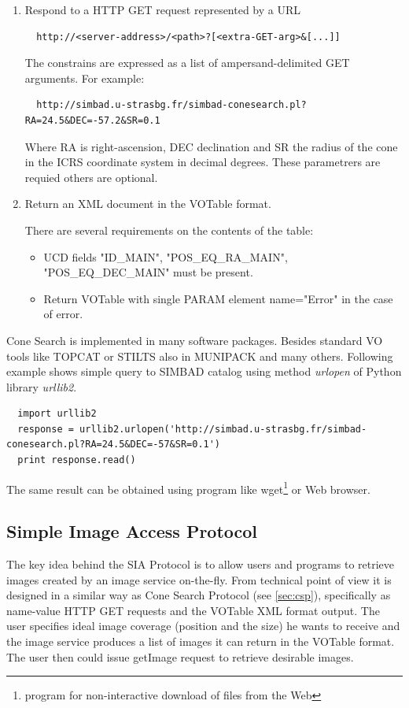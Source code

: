 \begin{enumerate}
\item Respond to a HTTP GET request represented by a URL 

\begin{lstlisting}
  http://<server-address>/<path>?[<extra-GET-arg>&[...]]
\end{lstlisting}

The constrains are expressed as a list of ampersand-delimited GET
arguments. For example:

\begin{lstlisting}
  http://simbad.u-strasbg.fr/simbad-conesearch.pl?RA=24.5&DEC=-57.2&SR=0.1
\end{lstlisting}

Where RA is right-ascension, DEC declination and SR the radius of the
cone in the ICRS coordinate system in decimal degrees. These
parametrers are requied others are optional.

\item Return an XML document in the VOTable format.  

  There are several requirements on the contents of the table:

  \begin{itemize}
  \item UCD fields "ID\_MAIN", "POS\_EQ\_RA\_MAIN", "POS\_EQ\_DEC\_MAIN" must
    be present.
  \item Return VOTable with single PARAM element name="Error" in the
    case of error.
  \end{itemize}

\end{enumerate}

Cone Search is implemented in many software packages. Besides standard
VO tools like TOPCAT or STILTS also in MUNIPACK and many others.
Following example shows simple query to SIMBAD \citep{wenger2000simbad}
catalog using method \emph{urlopen} of Python library \emph{urllib2}.
 
\begin{lstlisting}
  import urllib2
  response = urllib2.urlopen('http://simbad.u-strasbg.fr/simbad-conesearch.pl?RA=24.5&DEC=-57&SR=0.1')
  print response.read()
\end{lstlisting}

\noindent The same result can be obtained using program like wget\footnote{program
  for non-interactive download of files from the Web} or Web browser.

\subsection{Simple Image Access Protocol}
The key idea behind the SIA Protocol is to allow users and programs to
retrieve images created by an image service on-the-fly. From technical
point of view it is designed in a similar way as Cone Search Protocol
(see \ref{sec:csp}), specifically as name-value HTTP GET requests and
the VOTable XML format output. The user specifies ideal image coverage
(position and the size) he wants to receive and the image service
produces a list of images it can return in the VOTable format. The
user then could issue getImage request to retrieve desirable images.

